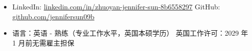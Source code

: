\documentclass{zh_resume}
\begin{document}
\begin{itemize}[parsep=0.5ex]
  \item LinkedIn: \href{https://www.linkedin.com/in/zhuoyan-jennifer-sun-8b6558297}{linkedin.com/in/zhuoyan-jennifer-sun-8b6558297} \quad GitHub: \href{https://github.com/jennifersun09b}{github.com/jennifersun09b}
  \item 语言：英语 - 熟练（专业工作水平，英国本硕学历） \quad 英国工作许可：2029 年 1 月前无需雇主担保
\end{itemize}
\end{document}
